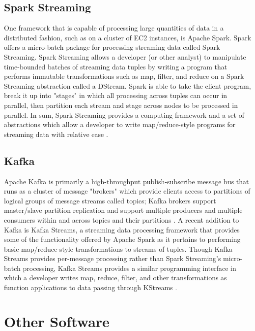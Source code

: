 \documentclass{thesis}
\begin{document}
    \subsection{Spark Streaming}
        One framework that is capable of processing large quantities of data in a distributed fashion,
        such as on a cluster of EC2 instances, is Apache Spark. Spark offers a micro-batch package for
        processing streaming data called Spark Streaming. Spark Streaming allows a developer (or other
        analyst) to manipulate time-bounded batches of streaming data tuples by writing a program that
        performs immutable transformations such as map, filter, and reduce on a Spark Streaming abstraction
        called a DStream. Spark is able to take the client program, break it up into "stages" in which
        all processing across tuples can occur in parallel, then partition each stream and stage
        across nodes to be processed in parallel. %
        In sum, Spark Streaming provides a computing framework and a set of abstractions which allow
        a developer to write map/reduce-style programs for streaming data with relative ease
        \cite{spark:streaming}.
    \subsection{Kafka}
        Apache Kafka is primarily a high-throughput publish-subscribe message bus that runs as a cluster
        of message "brokers" which provide clients access to partitions of logical groups of message streams
        called topics; Kafka brokers support master/slave partition replication and support multiple
        producers and multiple consumers within and across topics and their partitions \cite{kafka}.
        A recent addition to Kafka is Kafka Streams, a streaming data processing framework that
        provides some of the functionality offered by Apache Spark as it pertains to performing basic
        map/reduce-style transformations to streams of tuples. Though Kafka Streams provides per-message
        processing rather than Spark Streaming's micro-batch processing, Kafka Streams provides a similar
        programming interface in which a developer writes map, reduce, filter, and other
        transformations as function applications to data passing through KStreams \cite{kafka:streams}.
    \section{Other Software}
\end{document}
